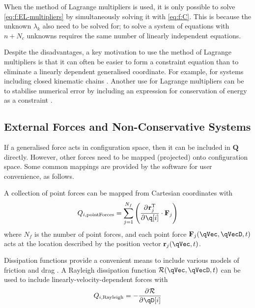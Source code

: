 \documentclass[11pt]{article}
\newcommand{\pD}[2]{
    \frac{\partial\mspace{1mu}#1}{\partial\mspace{1mu}#2}
}
\begin{document}
When the method of Lagrange multipliers is used, it is only possible to solve \eqref{eq:f:EL-multipliers} by simultaneously solving it with \eqref{eq:f:C}. This is because the unknown $\lambda_k$ also need to be solved for; to solve a system of equations with $n+N_c$ unknowns requires the same number of linearly independent equations.

Despite the disadvantages, a key motivation to use the method of Lagrange multipliers is that it can often be easier to form a constraint equation than to eliminate a linearly dependent generalised coordinate. For example, for systems including closed kinematic chains \cite{BJ-04}. Another use for Lagrange multipliers can be to stabilise numerical error by including an expression for conservation of energy as a constraint \cite{RF1-15}.


\subsection{External Forces and Non-Conservative Systems} \label{ssec:f:nonConservative}


If a generalised force acts in configuration space, then it can be included in $\mathbf{Q}$ directly. However, other forces need to be mapped (projected) onto configuration space. Some common mappings are provided by the software for user convenience, as follows.

A collection of point forces can be mapped from Cartesian coordinates with
\begin{equation}
    Q_{i,\mathrm{pointForces}} = \sum_{j=1}^{N_f} \del{\pD{\mathbf{r}_j^{\mathrm{T}}}{\q[i]} \cdot \mathbf{F}_j}
\end{equation}
where $N_f$ is the number of point forces, and each point force $\mathbf{F}_j(\qVec, \qVecD, t)$ acts at the location described by the position vector $\mathbf{r}_j(\qVec, t)$.

Dissipation functions provide a convenient means to include various models of friction and drag \cite{RF1-12,RFb-12}. A Rayleigh dissipation function $\mathcal{R}(\qVec, \qVecD, t)$ can be used to include linearly-velocity-dependent forces with
\begin{equation}
    Q_{i,\mathrm{Rayleigh}} = -\pD{\mathcal{R}}{\qD[i]}
\end{equation}
\end{document}
